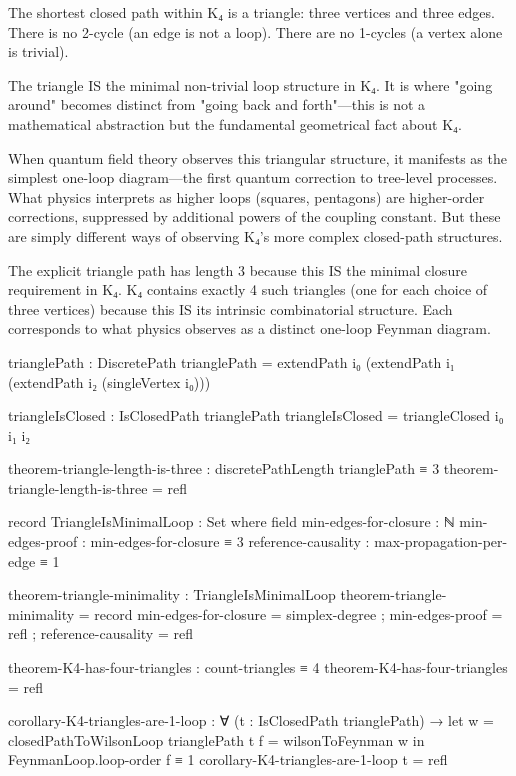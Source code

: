 \documentclass[11pt,a4paper]{book}
\begin{document}
The shortest closed path within K₄ is a triangle: three vertices and three edges. There is no 2-cycle (an edge is not a loop). There are no 1-cycles (a vertex alone is trivial).

The triangle IS the minimal non-trivial loop structure in K₄. It is where "going around" becomes distinct from "going back and forth"—this is not a mathematical abstraction but the fundamental geometrical fact about K₄.

When quantum field theory observes this triangular structure, it manifests as the simplest one-loop diagram—the first quantum correction to tree-level processes. What physics interprets as higher loops (squares, pentagons) are higher-order corrections, suppressed by additional powers of the coupling constant. But these are simply different ways of observing K₄'s more complex closed-path structures.

The explicit triangle path has length 3 because this IS the minimal closure requirement in K₄. K₄ contains exactly 4 such triangles (one for each choice of three vertices) because this IS its intrinsic combinatorial structure. Each corresponds to what physics observes as a distinct one-loop Feynman diagram.

\begin{code}
trianglePath : DiscretePath
trianglePath = extendPath i₀ (extendPath i₁ (extendPath i₂ (singleVertex i₀)))

triangleIsClosed : IsClosedPath trianglePath
triangleIsClosed = triangleClosed i₀ i₁ i₂

theorem-triangle-length-is-three : discretePathLength trianglePath ≡ 3
theorem-triangle-length-is-three = refl

record TriangleIsMinimalLoop : Set where
  field
    min-edges-for-closure : ℕ
    min-edges-proof : min-edges-for-closure ≡ 3
    reference-causality : max-propagation-per-edge ≡ 1

theorem-triangle-minimality : TriangleIsMinimalLoop
theorem-triangle-minimality = record
  { min-edges-for-closure = simplex-degree
  ; min-edges-proof = refl
  ; reference-causality = refl
  }

theorem-K4-has-four-triangles : count-triangles ≡ 4
theorem-K4-has-four-triangles = refl

corollary-K4-triangles-are-1-loop : ∀ (t : IsClosedPath trianglePath) →
  let w = closedPathToWilsonLoop trianglePath t
      f = wilsonToFeynman w
  in FeynmanLoop.loop-order f ≡ 1
corollary-K4-triangles-are-1-loop t = refl
\end{code}
\end{document}
